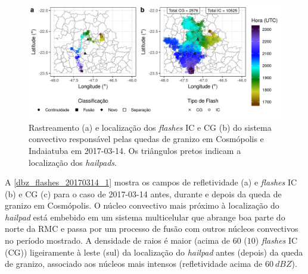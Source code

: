 \begin{figure}[htb]
	\begin{center}
		\caption{Rastreamento (a) e localização dos \textit{flashes} IC e CG (b) do sistema convectivo responsável pelas quedas de granizo em Cosmópolis e Indaiatuba em 2017-03-14. Os triângulos pretos indicam a localização dos \textit{hailpads}.} 
		\label{track_flashes_20170314}
		\includegraphics[width=\columnwidth]{../General_Processing/figures/track_flashes_20170314_ptbr.png}
	\end{center}
\end{figure}

A \autoref{dbz_flashes_20170314_1} mostra os campos de refletividade (a) e \textit{flashes} IC (b) e CG (c) para o caso de 2017-03-14 antes, durante e depois da queda de granizo em Cosmópolis. O núcleo convectivo mais próximo à localização do \textit{hailpad} está embebido em um sistema multicelular que abrange boa parte do norte da RMC e passa por um processo de fusão com outros núcleos convectivos no período mostrado. A densidade de raios é maior (acima de $60$ ($10$) \textit{flashes} IC (CG)) ligeiramente à leste (sul) da localização do \textit{hailpad} antes (depois) da queda de granizo, associado aos núcleos mais intensos (refletividade acima de $60\:dBZ$). 

